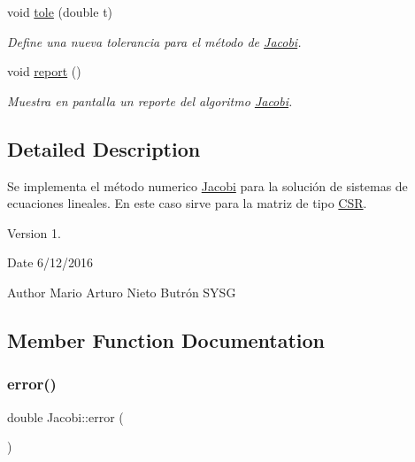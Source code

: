 \begin{DoxyCompactItemize}
void \hyperlink{class_jacobi_a43d8a58638f07dc6c427251efe5d6af8}{tole} (double t)
\begin{DoxyCompactList}\small\item\em Define una nueva tolerancia para el método de \hyperlink{class_jacobi}{Jacobi}. \end{DoxyCompactList}\item 
void \hyperlink{class_jacobi_abe57a404f09716e07721c74c715a3b42}{report} ()
\begin{DoxyCompactList}\small\item\em Muestra en pantalla un reporte del algoritmo \hyperlink{class_jacobi}{Jacobi}. \end{DoxyCompactList}\end{DoxyCompactItemize}


\subsection{Detailed Description}
Se implementa el método numerico \hyperlink{class_jacobi}{Jacobi} para la solución de sistemas de ecuaciones lineales. En este caso sirve para la matriz de tipo \hyperlink{class_c_s_r}{C\+SR}. 

\begin{DoxyVersion}{Version}
1. 
\end{DoxyVersion}
\begin{DoxyDate}{Date}
6/12/2016 
\end{DoxyDate}
\begin{DoxyAuthor}{Author}
Mario Arturo Nieto Butrón  S\+Y\+SG 
\end{DoxyAuthor}


\subsection{Member Function Documentation}
\hypertarget{class_jacobi_aaebdc79b8c4b4637e757cbea50ffda4b}{}\label{class_jacobi_aaebdc79b8c4b4637e757cbea50ffda4b} 
\subsubsection{\texorpdfstring{error()}{error()}}
{\footnotesize\ttfamily double Jacobi\+::error (\begin{DoxyParamCaption}{ }\end{DoxyParamCaption})\hspace{0.3cm}{\ttfamily [inline]}}



